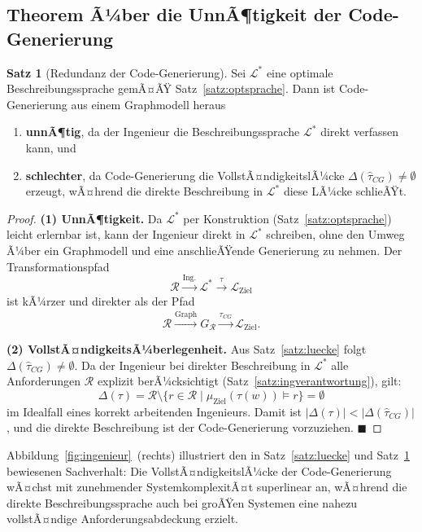 ﻿\documentclass[a4paper,12pt]{article}
\theoremstyle{definition}
\newtheorem{satz}{Satz}
\begin{document}
\subsection{Theorem Ã¼ber die UnnÃ¶tigkeit der Code-Generierung}

\begin{satz}[Redundanz der Code-Generierung]
\label{satz:codegen}
Sei $\mathcal{L}^*$ eine optimale Beschreibungssprache gemÃ¤ÃŸ Satz~\ref{satz:optsprache}.
Dann ist Code-Generierung aus einem Graphmodell heraus
\begin{enumerate}
  \item \textbf{unnÃ¶tig}, da der Ingenieur die Beschreibungssprache $\mathcal{L}^*$ direkt
        verfassen kann, und
  \item \textbf{schlechter}, da Code-Generierung die VollstÃ¤ndigkeitslÃ¼cke
        $\Delta(\hat{\tau}_{CG}) \neq \emptyset$ erzeugt, wÃ¤hrend die direkte Beschreibung
        in $\mathcal{L}^*$ diese LÃ¼cke schlieÃŸt.
\end{enumerate}
\end{satz}

\begin{proof}
\textbf{(1) UnnÃ¶tigkeit.}
Da $\mathcal{L}^*$ per Konstruktion (Satz~\ref{satz:optsprache}) leicht erlernbar ist,
kann der Ingenieur direkt in $\mathcal{L}^*$ schreiben, ohne den Umweg Ã¼ber ein
Graphmodell und eine anschlieÃŸende Generierung zu nehmen. Der Transformationspfad
\[
  \mathcal{R} \xrightarrow{\text{Ing.}} \mathcal{L}^* \xrightarrow{\tau} \mathcal{L}_{\text{Ziel}}
\]
ist kÃ¼rzer und direkter als der Pfad
\[
  \mathcal{R} \xrightarrow{\text{Graph}} G_\mathcal{R} \xrightarrow{\hat{\tau}_{CG}} \mathcal{L}_{\text{Ziel}}.
\]

\textbf{(2) VollstÃ¤ndigkeitsÃ¼berlegenheit.}
Aus Satz~\ref{satz:luecke} folgt $\Delta(\hat{\tau}_{CG}) \neq \emptyset$.
Da der Ingenieur bei direkter Beschreibung in $\mathcal{L}^*$ alle Anforderungen
$\mathcal{R}$ explizit berÃ¼cksichtigt (Satz~\ref{satz:ingverantwortung}), gilt:
\[
  \Delta(\tau) = \mathcal{R} \setminus \{r \in \mathcal{R} \mid \mu_{\text{Ziel}}(\tau(w)) \models r\}
  = \emptyset
\]
im Idealfall eines korrekt arbeitenden Ingenieurs.
Damit ist $|\Delta(\tau)| < |\Delta(\hat{\tau}_{CG})|$, und die direkte Beschreibung
ist der Code-Generierung vorzuziehen. $\blacksquare$
\end{proof}

Abbildung~\ref{fig:ingenieur}~(rechts) illustriert den in Satz~\ref{satz:luecke} und
Satz~\ref{satz:codegen} bewiesenen Sachverhalt: Die VollstÃ¤ndigkeitslÃ¼cke der
Code-Generierung wÃ¤chst mit zunehmender SystemkomplexitÃ¤t superlinear an, wÃ¤hrend
die direkte Beschreibungssprache auch bei groÃŸen Systemen eine nahezu vollstÃ¤ndige
Anforderungsabdeckung erzielt.
\end{document}
